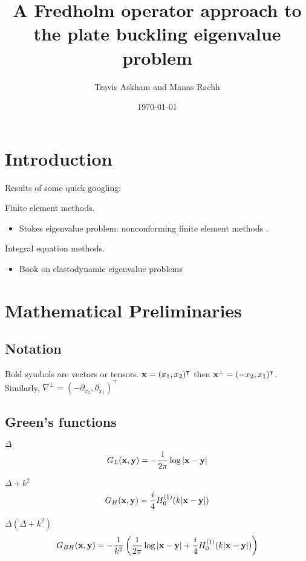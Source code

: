 \documentclass[preprint,12pt]{article}
\title{A Fredholm operator approach to the plate
buckling eigenvalue problem}
\author{Travis Askham and Manas Rachh}
\date{\today}
\def\xx{{\bf x}}
\def\yy{{\bf y}}
\begin{document}
\maketitle


\section{Introduction}

Results of some quick googling:

Finite element methods.
\begin{itemize}
\item Stokes eigenvalue problem: nonconforming finite
  element methods \cite{jia2009approximation}.
\end{itemize}

Integral equation methods.
\begin{itemize}
\item Book on elastodynamic eigenvalue problems
  \cite{kitahara2014boundary}
\end{itemize}
\section{Mathematical Preliminaries}

\subsection{Notation}

Bold symbols are vectors or tensors.
$\xx = (x_1,x_2)^\intercal$ then $\xx^\bot = (-x_2,x_1)^\intercal$.
Similarly, $\nabla^\bot = (-\partial_{x_2},\partial_{x_1})^\intercal$

\subsection{Green's functions}

$\Delta$
\begin{equation}
  G_L(\xx,\yy) = -\frac{1}{2\pi} \log |\xx-\yy|
\end{equation}

$\Delta + k^2$
\begin{equation}
  G_H(\xx,\yy) = \frac{i}{4} H_0^{(1)}(k|\xx-\yy|)
\end{equation}

$\Delta(\Delta + k^2)$
\begin{equation}
  G_{BH}(\xx,\yy) = -\frac{1}{k^2}
  \left (\frac{1}{2\pi} \log |\xx-\yy| +
  \frac{i}{4} H_0^{(1)}(k|\xx-\yy|) \right )
\end{equation}
\end{document}
